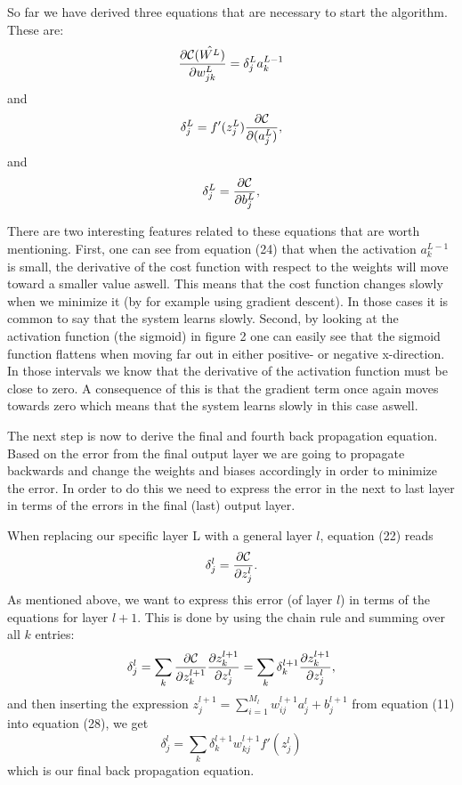 \documentclass[a4paper,12pt]{article}
\begin{document}
So far we have derived three equations that are necessary to start the algorithm. These are:
\begin{equation}
    \frac{\partial{\cal C}(\hat{W^L})}{\partial w_{jk}^L}  =  \delta_j^La_k^{L-1}
\end{equation}
and
\begin{equation}
\delta_j^L = f'(z_j^L)\frac{\partial {\cal C}}{\partial (a_j^L)},
\end{equation}
and
\begin{equation}
\delta_j^L = \frac{\partial {\cal C}}{\partial b_j^L},
\end{equation}

There are two interesting features related to these equations that are worth mentioning. First, one can see from equation (24) that when the activation $a_k^{L-1}$ is small, the derivative of the cost function with respect to the weights will move toward a smaller value aswell. This means that the cost function changes slowly when we minimize it (by for example using gradient descent). In those cases it is common to say that the system learns slowly.\newline
Second, by looking at the activation function (the sigmoid) in figure 2 one can easily see that the sigmoid function flattens when moving far out in either positive- or negative x-direction. In those intervals we know that the derivative of the activation function must be close to zero. A consequence of this is that the gradient term once again moves towards zero which means that the system learns slowly in this case aswell.\newline

The next step is now to derive the final and fourth back propagation equation. Based on the error from the final output layer we are going to propagate backwards and change the weights and biases accordingly in order to minimize the error. In order to do this we need to express the error in the next to last layer in terms of the errors in the final (last) output layer.\newline

When replacing our specific layer L with a general layer $l$, equation (22) reads
\begin{equation}
    \delta_j^l =\frac{\partial {\cal C}}{\partial z_j^l}.
\end{equation}
As mentioned above, we want to express this error (of layer $l$) in terms of the equations for layer $l+1$. This is done by using the chain rule and summing over all $k$ entries:
\begin{equation}
    \delta_j^l =\sum_k \frac{\partial {\cal C}}{\partial z_k^{l+1}}\frac{\partial z_k^{l+1}}{\partial z_j^{l}}=\sum_k \delta_k^{l+1}\frac{\partial z_k^{l+1}}{\partial z_j^{l}},
\end{equation}
and then inserting the expression $z_j^{l+1} = \sum_{i=1}^{M_{l}}w_{ij}^{l+1}a_j^{l}+b_j^{l+1}$ from equation (11) into equation (28), we get
\begin{equation}
    \delta_j^l =\sum_k \delta_k^{l+1}w_{kj}^{l+1}f'(z_j^l)
\end{equation}
which is our final back propagation equation.
\end{document}
